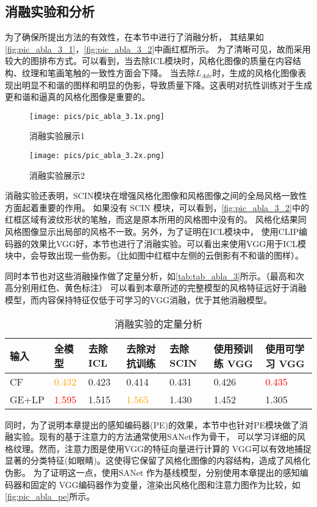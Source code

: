 \subsection{消融实验和分析}
为了确保所提出方法的有效性，在本节中进行了消融分析，
其结果如\autoref{fig:pic_abla_3_1}，\autoref{fig:pic_abla_3_2}中画红框所示。
为了清晰可见，故而采用较大的图排布方式。可以看到，当去除ICL模块时，风格化图像的质量在内容结构、纹理和笔画笔触的一致性方面会下降。
当去除$L_{Adv}$时，生成的风格化图像表现出明显不和谐的图样和明显的伪影，导致质量下降。这表明对抗性训练对于生成更和谐和逼真的风格化图像是重要的。

\begin{figure}[htb]
    \centering
    \texttt{[image: pics/pic\_abla\_3.1x.png]}
    \caption{\label{fig:pic_abla_3_1}消融实验展示1}
\end{figure}
\begin{figure}[htb]
    \centering
    \texttt{[image: pics/pic\_abla\_3.2x.png]}
    \caption{\label{fig:pic_abla_3_2}消融实验展示2}
\end{figure}
消融实验还表明，SCIN模块在增强风格化图像和风格图像之间的全局风格一致性方面起着重要的作用。
如果没有 SCIN 模块，可以看到，\autoref{fig:pic_abla_3_2}中的红框区域有波纹形状的笔触，而这是原本所用的风格图中没有的。
风格化结果同风格图像显示出局部的风格不一致。另外，为了证明在ICL模块中，
使用CLIP编码器的效果比VGG好，本节也进行了消融实验。可以看出来使用VGG用于ICL模块中，会导致出现一些伪影。（比如图中红框中左侧的云倒影有不和谐的图样）。
\par 同时本节也对这些消融操作做了定量分析，如\autoref{tab:tab_abla_3}所示。（最高和次高分别用红色、黄色标注）
可以看到本章所述的完整模型的风格特征远好于消融模型，而内容保持特征仅低于可学习的VGG消融，优于其他消融模型。

\begin{table}[htb]
    \caption{\label{tab:tab_abla_3}消融实验的定量分析}
    \begin{tabularx}{\linewidth}{X<{\centering}|X<{\centering}|X<{\centering}|X<{\centering}|X<{\centering}|X<{\centering}|X<{\centering}}
        \hline
        输入   & 全模型 & 去除 ICL & 去除对抗训练 & 去除 SCIN & 使用预训练 VGG & 使用可学习 VGG \\ \hline

        CF    & \textcolor{orange}{0.432}  & 0.423 & 0.414 & 0.431 & 0.426 & \textcolor{red}{0.435}  \\
        GE+LP & \textcolor{red}{1.595} & 1.515 & \textcolor{orange}{1.565} & 1.430 & 1.452 & 1.305 \\ \hline

    \end{tabularx}
\end{table}
\par 同时，为了说明本章提出的感知编码器(PE)的效果，本节中也针对PE模块做了消融实验。现有的基于注意力的方法通常使用SANet作为骨干，
可以学习详细的风格纹理。然而，注意力图是使用VGG的特征向量进行计算的
VGG可以有效地捕捉显著的分类特征(如眼睛)。这使得它保留了风格化图像的内容结构，造成了风格化伪影。
为了证明这一点，使用SANet 作为基线模型，分别使用本章提出的感知编码器和固定的 VGG编码器作为变量，渲染出风格化图和注意力图作为比较，如\autoref{fig:pic_abla_pe}所示。

